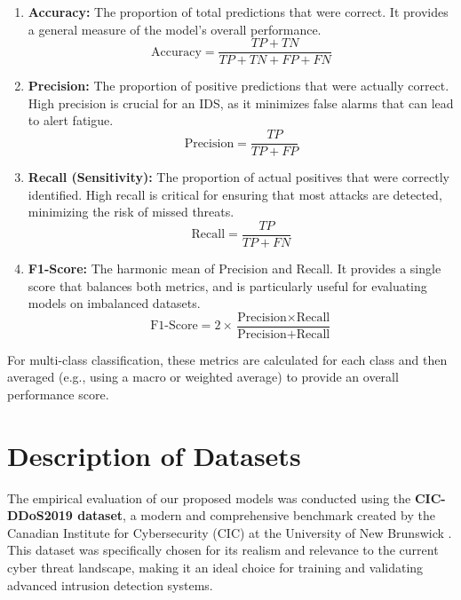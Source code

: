 \documentclass[16pt]{report}
\begin{document}
\begin{enumerate}
    \item \textbf{Accuracy:} The proportion of total predictions that were correct. It provides a general measure of the model's overall performance.
    \begin{equation}
        \text{Accuracy} = \frac{TP + TN}{TP + TN + FP + FN}
    \end{equation}

    \item \textbf{Precision:} The proportion of positive predictions that were actually correct. High precision is crucial for an IDS, as it minimizes false alarms that can lead to alert fatigue.
    \begin{equation}
        \text{Precision} = \frac{TP}{TP + FP}
    \end{equation}

    \item \textbf{Recall (Sensitivity):} The proportion of actual positives that were correctly identified. High recall is critical for ensuring that most attacks are detected, minimizing the risk of missed threats.
    \begin{equation}
        \text{Recall} = \frac{TP}{TP + FN}
    \end{equation}

    \item \textbf{F1-Score:} The harmonic mean of Precision and Recall. It provides a single score that balances both metrics, and is particularly useful for evaluating models on imbalanced datasets.
    \begin{equation}
        \text{F1-Score} = 2 \times \frac{\text{Precision} \times \text{Recall}}{\text{Precision} + \text{Recall}}
    \end{equation}
\end{enumerate}

For multi-class classification, these metrics are calculated for each class and then averaged (e.g., using a macro or weighted average) to provide an overall performance score.

\section{Description of Datasets}
The empirical evaluation of our proposed models was conducted using the \textbf{CIC-DDoS2019 dataset}, a modern and comprehensive benchmark created by the Canadian Institute for Cybersecurity (CIC) at the University of New Brunswick \cite{cicddos2019}. This dataset was specifically chosen for its realism and relevance to the current cyber threat landscape, making it an ideal choice for training and validating advanced intrusion detection systems.
\end{document}
